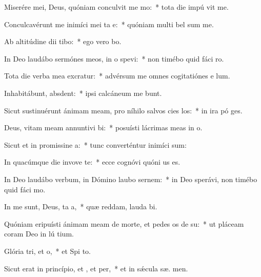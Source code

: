 \item Miserére mei, Deus, quóniam conculvit me mo:~* tota die impú vit me.
\item Conculcavérunt me inimíci mei ta e:~* quóniam multi bel sum me.
\item Ab altitúdine dii tibo:~* ego vero   bo.
\item In Deo laudábo sermónes meos, in o spevi:~* non timébo quid fáci  ro.
\item Tota die verba mea excratur:~* advérsum me omnes cogitatiónes e  lum.
\item Inhabitábunt,  absdent:~* ipsi calcáneum me bunt.
\item Sicut sustinuérunt ánimam meam, pro níhilo salvos cies los:~* in ira pó ges.
\item Deus, vitam meam annuntivi bi:~* posuísti lácrimas meas in  o.
\item Sicut et in promissine a:~* tunc converténtur inimíci  sum:
\item In quacúmque die invove te:~* ecce cognóvi quóni  us es.
\item In Deo laudábo verbum, in Dómino laubo sernem:~* in Deo sperávi, non timébo quid fáci  mo.
\item In me sunt, Deus, ta a,~* quæ reddam, lauda bi.
\item Quóniam eripuísti ánimam meam de morte, et pedes os de su:~* ut pláceam coram Deo in lú tium.
\item Glória tri, et o,~* et Spi to.
\item Sicut erat in princípio, et , et per,~* et in sǽcula sæ. men.
